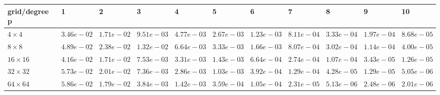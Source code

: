 \begin{tabular}{lllllllllll}
\hline
 grid/degree p   & 1          & 2          & 3          & 4          & 5          & 6          & 7          & 8          & 9          & 10         \\
\hline
 $4 \times 4$    & $3.46e-02$ & $1.71e-02$ & $9.51e-03$ & $4.77e-03$ & $2.67e-03$ & $1.23e-03$ & $8.11e-04$ & $3.33e-04$ & $1.97e-04$ & $8.68e-05$ \\
 $8 \times 8$    & $4.89e-02$ & $2.38e-02$ & $1.32e-02$ & $6.64e-03$ & $3.33e-03$ & $1.66e-03$ & $8.07e-04$ & $3.02e-04$ & $1.14e-04$ & $4.00e-05$ \\
 $16 \times 16$  & $4.16e-02$ & $1.71e-02$ & $7.53e-03$ & $3.31e-03$ & $1.43e-03$ & $6.64e-04$ & $2.74e-04$ & $1.07e-04$ & $3.43e-05$ & $1.26e-05$ \\
 $32 \times 32$  & $5.73e-02$ & $2.01e-02$ & $7.36e-03$ & $2.86e-03$ & $1.03e-03$ & $3.92e-04$ & $1.29e-04$ & $4.28e-05$ & $1.29e-05$ & $5.05e-06$ \\
 $64 \times 64$  & $5.86e-02$ & $1.79e-02$ & $3.84e-03$ & $1.42e-03$ & $3.59e-04$ & $1.05e-04$ & $2.31e-05$ & $5.13e-06$ & $2.48e-06$ & $2.01e-06$ \\
\hline
\end{tabular}